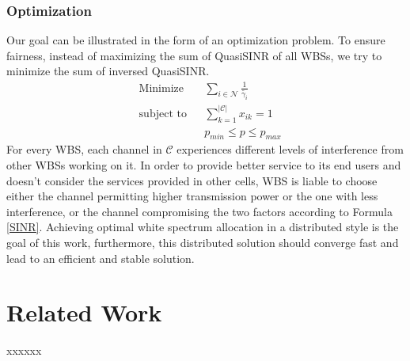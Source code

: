 \subsubsection*{Optimization}
Our goal can be illustrated in the form of an optimization problem.
To ensure fairness, instead of maximizing the sum of QuasiSINR of all WBSs, we try to minimize the sum of inversed QuasiSINR. 
	\begin{equation}
\label{problem}
			\begin{aligned}
			& {\text{Minimize}}
			& & \sum_{i\in \mathcal{N}}\frac{1}{\tilde{\gamma_{i}}} \\
			& \text{subject to}
			& & \sum_{k=1}^{|\mathcal{C}|}x_{ik}=1 \\
			& & & p_{min} \leq p \leq p_{max}
			\end{aligned}
		\end{equation}
For every WBS, each channel in $\mathcal{C}$ experiences different levels of interference from other WBSs working on it.
In order to provide better service to its end users and doesn't consider the services provided in other cells, WBS is liable to choose either the channel permitting higher transmission power or the one with less interference, or the channel compromising the two factors according to Formula \ref{SINR}.
 Achieving optimal white spectrum allocation in a distributed style is the goal of this work, furthermore, this distributed solution should converge fast and lead to an efficient and stable solution.


\section{Related Work}
\label{relatedWork}
xxxxxx

